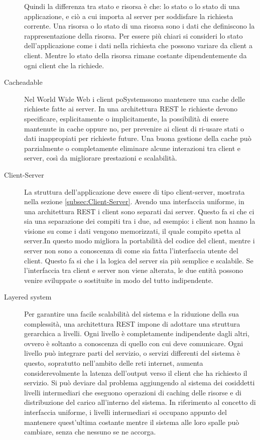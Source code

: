 \begin{description}
Quindi la differenza tra stato e risorsa è che: lo stato o lo stato di una applicazione, e ciò a cui importa al server per soddisfare la richiesta corrente. Una risorsa o lo stato di una risorsa sono i dati che definiscono la rappresentazione della risorsa.
Per essere più chiari si consideri lo stato dell'applicazione come i dati nella richiesta che possono variare da client a client. Mentre lo stato della risorsa rimane costante dipendentemente da ogni client che la richiede.

\item[Cacheadable]

Nel World Wide Web i client poSystemssono mantenere una cache delle richieste fatte ai server. In una architettura REST le richieste devono specificare, esplicitamente o implicitamente, la possibilità di essere mantenute in cache oppure no, per prevenire ai client di ri-usare stati o dati inappropiati per richieste future. Una buona gestione della cache può parzialmente o completamente eliminare alcune interazioni tra client e server, così da migliorare prestazioni e scalabilità.

\item[Client-Server]  

La struttura dell'applicazione deve essere di tipo client-server, mostrata nella sezione \ref{subsec:Client-Server}. Avendo una interfaccia uniforme, in una architettura REST i client sono separati dai server. Questo fa si che ci sia una separazione dei compiti tra i due, ad esempio: i client non hanno la visione su come i dati vengono memorizzati, il quale compito spetta al server.In questo modo migliora la portabilità del codice del client, mentre i server non sono a conoscenza di come sia fatta l'interfaccia utente del client. Questo fa si che i la logica del server sia più semplice e scalabile. Se l'interfaccia tra client e server non viene alterata, le due entità possono venire sviluppate o sostituite in modo del tutto indipendente.  

\item[Layered system]

Per garantire una facile scalabilità del sistema e la riduzione della sua complessità, una architettura REST impone di adottare una struttura gerarchica a livelli. Ogni livello è completamente indipendente dagli altri, ovvero è soltanto a conoscenza di quello con cui deve comunicare. Ogni livello può integrare parti del servizio, o servizi differenti del sistema è questo, sopratutto nell'ambito delle reti internet, aumenta considerevolmente la latenza dell'output verso il client che ha richiesto il servizio. Si può deviare dal problema aggiungendo al sistema dei cosiddetti livelli intermediari che eseguono operazioni di caching delle risorse e di distribuzione del carico all'interno del sistema.
In riferimento al concetto di interfaccia uniforme, i livelli intermediari si occupano appunto del mantenere quest'ultima costante mentre il sistema alle loro spalle può cambiare, senza che nessuno se ne accorga.


\end{description}
